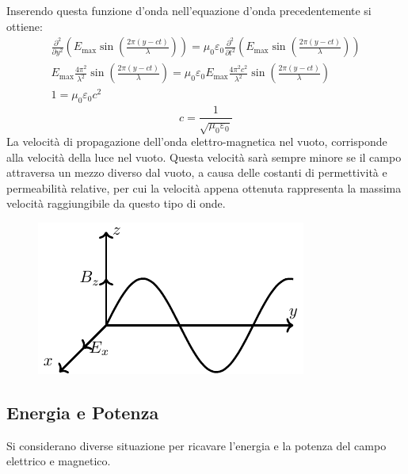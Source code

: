 \documentclass{article}
\numberwithin{equation}{subsection}
\begin{document}
Inserendo questa funzione d'onda nell'equazione d'onda precedentemente si ottiene:
\begin{gather*}
    \displaystyle\frac{\partial^2}{\partial y^2}\left(E_{\max}\sin\left(\displaystyle\frac{2\pi (y-ct)}{\lambda}\right)\right)=\mu_0\varepsilon_0\frac{\partial^2}{\partial t^2}\left(E_{\max}\sin\left(\displaystyle\frac{2\pi (y-ct)}{\lambda}\right)\right)\\
    \displaystyle E_{\max}\frac{4\pi^2}{\lambda^2}\sin\left(\frac{2\pi (y-ct)}{\lambda}\right)=\mu_0\varepsilon_0E_{\max}\frac{4\pi^2c^2}{\lambda^2}\sin\left(\frac{2\pi (y-ct)}{\lambda}\right)\\
    1=\mu_0\varepsilon_0c^2
\end{gather*}
\begin{equation}
    c=\displaystyle\frac{1}{\sqrt{\mu_0\varepsilon_0}}
\end{equation}
La velocità di propagazione dell'onda elettro-magnetica nel vuoto, corrisponde alla velocità della luce nel vuoto. Questa velocità sarà sempre minore se il campo attraversa 
un mezzo diverso dal vuoto, a causa delle costanti di permettività e permeabilità relative, per cui la velocità appena ottenuta rappresenta la massima velocità raggiungibile 
da questo tipo di onde. 

\begin{figure}[H]%
    \centering
    \includegraphics{onda-elettro-magnetica.pdf}%
    \label{fig:onta-elettro-magnetica}
\end{figure}

\subsection{Energia e Potenza}

Si considerano diverse situazione per ricavare l'energia e la potenza del campo elettrico e magnetico.
\end{document}
